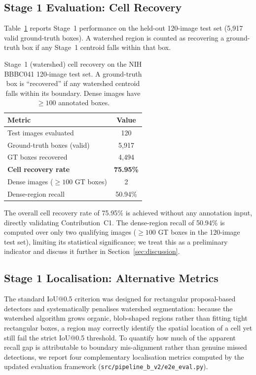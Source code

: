 \documentclass[review,12pt]{elsarticle}
\begin{document}
\subsection{Stage 1 Evaluation: Cell Recovery}
\label{ssec:stage1_results}

Table~\ref{tab:stage1} reports Stage~1 performance on the held-out
120-image test set (5,917 valid ground-truth boxes). A watershed region
is counted as recovering a ground-truth box if any Stage~1 centroid falls
within that box.

\begin{table}[H]
\centering
\small
\caption{Stage~1 (watershed) cell recovery on the NIH BBBC041 120-image
  test set. A ground-truth box is ``recovered'' if any watershed centroid
  falls within its boundary. Dense images have $\geq 100$ annotated boxes.}
\label{tab:stage1}
\renewcommand{\arraystretch}{1.15}
\begin{tabular}{lc}
\toprule
\textbf{Metric} & \textbf{Value} \\
\midrule
Test images evaluated              & 120 \\
Ground-truth boxes (valid)         & 5,917 \\
GT boxes recovered                 & 4,494 \\
\textbf{Cell recovery rate}        & \textbf{75.95\%} \\
\midrule
Dense images ($\geq 100$ GT boxes) & 2 \\
Dense-region recall                & 50.94\% \\
\bottomrule
\end{tabular}
\end{table}

The overall cell recovery rate of 75.95\% is achieved without any
annotation input, directly validating Contribution~C1. The dense-region
recall of 50.94\% is computed over only two qualifying images ($\geq 100$
GT boxes in the 120-image test set), limiting its statistical significance;
we treat this as a preliminary indicator and discuss it further in
Section~\ref{sec:discussion}.

\subsection{Stage 1 Localisation: Alternative Metrics}
\label{ssec:stage1_alt_metrics}

The standard IoU@0.5 criterion was designed for rectangular proposal-based
detectors and systematically penalises watershed segmentation: because the
watershed algorithm grows organic, blob-shaped regions rather than fitting
tight rectangular boxes, a region may correctly identify the spatial location
of a cell yet still fail the strict IoU@0.5 threshold.  To quantify how much
of the apparent recall gap is attributable to boundary mis-alignment rather
than genuine missed detections, we report four complementary localisation
metrics computed by the updated evaluation framework
(\texttt{src/pipeline\_b\_v2/e2e\_eval.py}).
\end{document}
